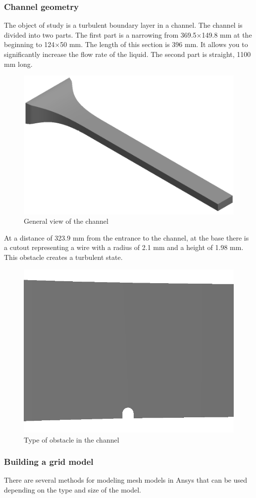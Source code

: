\subsubsection{Channel geometry}
	The object of study is a turbulent boundary layer in a channel. The channel is divided into two parts. The first part is a narrowing from 369.5$\times$149.8 mm at the beginning to 124$\times$50 mm. The length of this section is 396 mm. It allows you to significantly increase the flow rate of the liquid. The second part is straight, 1100 mm long.
	\begin{figure}[H]
		\centering
		\includegraphics[width=0.7\linewidth]{../Assets/ВидКанала1}
		\caption{\footnotesize{General view of the channel}}
		\label{fig:channelview}
	\end{figure}
	At a distance of 323.9 mm from the entrance to the channel, at the base there is a cutout representing a wire with a radius of 2.1 mm and a height of 1.98 mm. This obstacle creates a turbulent state.
	\begin{figure}[H]
		\centering
		\includegraphics[width=0.6\linewidth]{../Assets/ВидКанала4}
		\caption{\footnotesize{Type of obstacle in the channel}}
		\label{fig:vortexgeneratorview}
	\end{figure}
\subsubsection{Building a grid model}
	There are several methods for modeling mesh models in Ansys that can be used depending on the type and size of the model.
	
